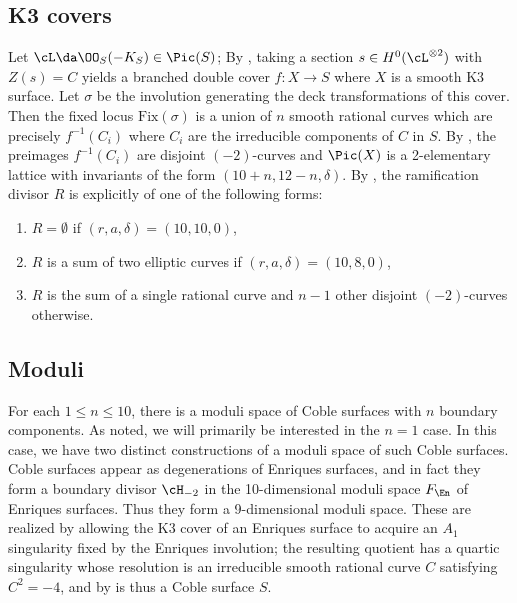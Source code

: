 \documentclass[../../main.tex]{subfiles}
\begin{document}
\subsection{K3 covers}

\begin{remark}[On relation to K3s]
Let $\cL \da \OO_S(-K_S) \in \Pic(S)$; By \cite[Prop. 9.1.1]{DK24}, taking a section $s\in H^0(\cL ^{\otimes 2})$ with $Z(s) = C$ yields a branched double cover $f: X\to S$ where $X$ is a smooth K3 surface. Let $\sigma$ be the involution generating the deck transformations of this cover. Then the fixed locus $\mathrm{Fix}(\sigma)$ is a union of $n$ smooth rational curves which are precisely $f^{-1}(C_i)$ where $C_i$ are the irreducible components of $C$ in $S$. By \cite[Def. 5.4.3]{CD12}, the preimages $f^{-1}(C_i)$ are disjoint $(-2)$-curves and $\Pic(X)$ is a 2-elementary lattice with invariants of the form $(10+n, 12-n, \delta)$. By \cite[Def. 5.4.3, Eqn. 5.3.1]{CD12}, the ramification divisor $R$ is explicitly of one of the following forms:

\begin{enumerate}
    \item $R=\emptyset$ if $(r,a,\delta) = (10, 10, 0)$,
    \item $R$ is a sum of two elliptic curves if $(r,a,\delta) = (10, 8, 0)$,
    \item $R$ is the sum of a single rational curve and $n-1$ other disjoint $(-2)$-curves otherwise.
\end{enumerate}
\end{remark}

\subsection{Moduli}

\begin{remark}
For each $1\leq n \leq 10$, there is a moduli space of Coble surfaces with $n$ boundary components. As noted, we will primarily be interested in the $n=1$ case. In this case, we have two distinct constructions of a moduli space of such Coble surfaces. Coble surfaces appear as degenerations of Enriques surfaces, and in fact they form a boundary divisor $\cH_{-2}$ in the 10-dimensional moduli space $F_{\En}$ of Enriques surfaces. Thus they form a 9-dimensional moduli space.  These are realized by allowing the K3 cover of an Enriques surface to acquire an $A_1$ singularity fixed by the Enriques involution; the resulting quotient has a quartic singularity whose resolution is an irreducible smooth rational curve $C$ satisfying $C^2 = -4$, and by \cite[p.\, 8]{Nue15} is thus a Coble surface $S$. 
\end{remark}
\end{document}
